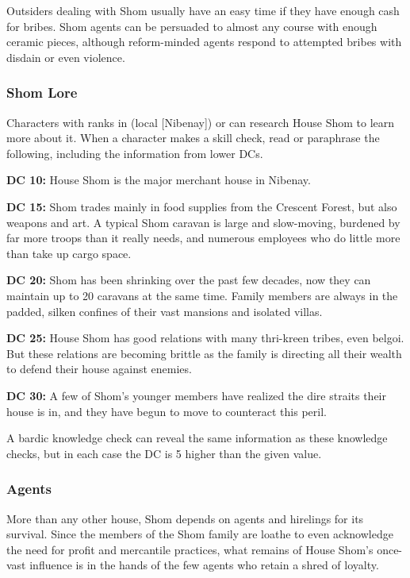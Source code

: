 Outsiders dealing with Shom usually have an easy time if they have enough cash for bribes. Shom agents can be persuaded to almost any course with enough ceramic pieces, although reform-minded agents respond to attempted bribes with disdain or even violence.

\subsubsection{Shom Lore}
Characters with ranks in  (local [Nibenay]) or  can research House Shom to learn more about it. When a character makes a skill check, read or paraphrase the following, including the information from lower DCs.

\textbf{DC 10:} House Shom is the major merchant house in Nibenay.

\textbf{DC 15:} Shom trades mainly in food supplies from the Crescent Forest, but also weapons and art. A typical Shom caravan is large and slow-moving, burdened by far more troops than it really needs, and numerous employees who do little more than take up cargo space.

\textbf{DC 20:} Shom has been shrinking over the past few decades, now they can maintain up to 20 caravans at the same time. Family members are always in the padded, silken confines of their vast mansions and isolated villas.

\textbf{DC 25:} House Shom has good relations with many thri-kreen tribes, even belgoi. But these relations are becoming brittle as the family is directing all their wealth to defend their house against enemies.

\textbf{DC 30:} A few of Shom's younger members have realized the dire straits their house is in, and they have begun to move to counteract this peril.

A bardic knowledge check can reveal the same information as these knowledge checks, but in each case the DC is 5 higher than the given value.

\subsubsection{Agents}
More than any other house, Shom depends on agents and hirelings for its survival. Since the members of the Shom family are loathe to even acknowledge the need for profit and mercantile practices, what remains of House Shom's once-vast influence is in the hands of the few agents who retain a shred of loyalty.

